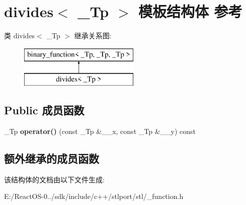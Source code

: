 \hypertarget{structdivides}{}\section{divides$<$ \+\_\+\+Tp $>$ 模板结构体 参考}
\label{structdivides}
类 divides$<$ \+\_\+\+Tp $>$ 继承关系图\+:\begin{figure}[H]
\begin{center}
\leavevmode
\includegraphics[height=2.000000cm]{structdivides}
\end{center}
\end{figure}
\subsection*{Public 成员函数}
\begin{DoxyCompactItemize}
\item 
\mbox{\label{structdivides_a880fd87ea8eb53742e165398ed7dcb19}} 
\+\_\+\+Tp {\bfseries operator()} (const \+\_\+\+Tp \&\+\_\+\+\_\+x, const \+\_\+\+Tp \&\+\_\+\+\_\+y) const
\end{DoxyCompactItemize}
\subsection*{额外继承的成员函数}


该结构体的文档由以下文件生成\+:\begin{DoxyCompactItemize}
\item 
E\+:/\+React\+O\+S-\/0../sdk/include/c++/stlport/stl/\+\_\+function.\+h\end{DoxyCompactItemize}
